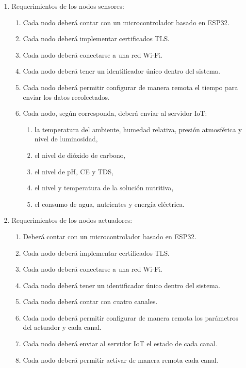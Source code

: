 \begin{enumerate}
	\item Requerimientos de los nodos sensores:
	      \begin{enumerate}
		      \item Cada nodo deberá contar con un microcontrolador basado en ESP32.
		      \item Cada nodo deberá implementar certificados TLS.
		      \item Cada nodo deberá conectarse a una red Wi-Fi.
		      \item Cada nodo deberá tener un identificador único dentro del sistema.
		      \item Cada nodo deberá permitir configurar de manera remota el tiempo para enviar los
		            datos recolectados.
		      \item Cada nodo, según corresponda, deberá enviar al servidor IoT:
		            \begin{enumerate}
			            \item la temperatura del ambiente, humedad relativa, presión atmosférica y nivel de
			                  luminosidad,
			            \item el nivel de dióxido de carbono,
			            \item el nivel de pH, CE y TDS,
			            \item el nivel y temperatura de la solución nutritiva,
			            \item el consumo de agua, nutrientes y energía eléctrica.
		            \end{enumerate}
	      \end{enumerate}

	\item Requerimientos de los nodos actuadores:
	      \begin{enumerate}
		      \item Deberá contar con un microcontrolador basado en ESP32.
		      \item Cada nodo deberá implementar certificados TLS.
		      \item Cada nodo deberá conectarse a una red Wi-Fi.
		      \item Cada nodo deberá tener un identificador único dentro del sistema.
		      \item Cada nodo deberá contar con cuatro canales.
		      \item Cada nodo deberá permitir configurar de manera remota los parámetros del
		            actuador y cada canal.
		      \item Cada nodo deberá enviar al servidor IoT el estado de cada canal.
		      \item Cada nodo deberá permitir activar de manera remota cada canal.
	      \end{enumerate}


\end{enumerate}
